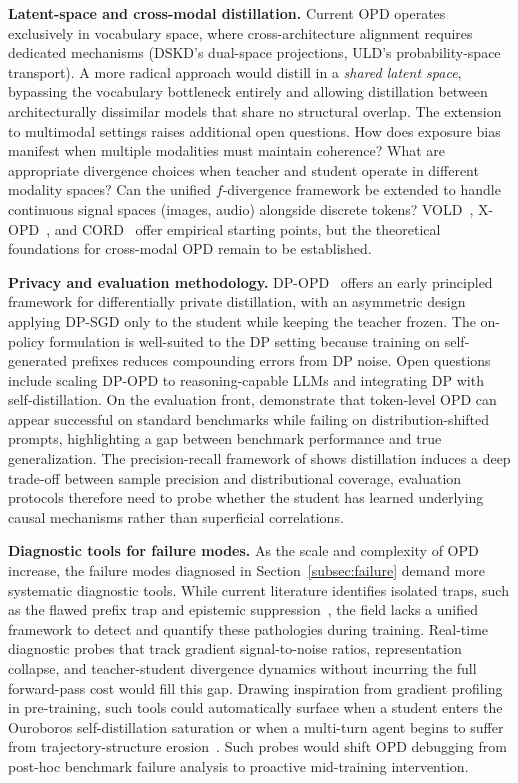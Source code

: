 \documentclass{article} %
\begin{document}
\textbf{Latent-space and cross-modal distillation.} Current OPD operates exclusively in vocabulary space, where cross-architecture alignment requires dedicated mechanisms (DSKD's dual-space projections, ULD's probability-space transport). A more radical approach would distill in a \emph{shared latent space}, bypassing the vocabulary bottleneck entirely and allowing distillation between architecturally dissimilar models that share no structural overlap. The extension to multimodal settings raises additional open questions. How does exposure bias manifest when multiple modalities must maintain coherence? What are appropriate divergence choices when teacher and student operate in different modality spaces? Can the unified $f$-divergence framework be extended to handle continuous signal spaces (images, audio) alongside discrete tokens? VOLD~\citep{2510.23497}, X-OPD~\citep{2603.24596}, and CORD~\citep{2601.16547} offer empirical starting points, but the theoretical foundations for cross-modal OPD remain to be established.

\textbf{Privacy and evaluation methodology.} DP-OPD~\citep{2604.04461} offers an early principled framework for differentially private distillation, with an asymmetric design applying DP-SGD only to the student while keeping the teacher frozen. The on-policy formulation is well-suited to the DP setting because training on self-generated prefixes reduces compounding errors from DP noise. Open questions include scaling DP-OPD to reasoning-capable LLMs and integrating DP with self-distillation. On the evaluation front, \citet{2603.25562} demonstrate that token-level OPD can appear successful on standard benchmarks while failing on distribution-shifted prompts, highlighting a gap between benchmark performance and true generalization. The precision-recall framework of \citet{2505.13111} shows distillation induces a deep trade-off between sample precision and distributional coverage, evaluation protocols therefore need to probe whether the student has learned underlying causal mechanisms rather than superficial correlations.

\textbf{Diagnostic tools for failure modes.} As the scale and complexity of OPD increase, the failure modes diagnosed in Section~\ref{subsec:failure} demand more systematic diagnostic tools. While current literature identifies isolated traps, such as the flawed prefix trap and epistemic suppression~\citep{2603.24472}, the field lacks a unified framework to detect and quantify these pathologies during training. Real-time diagnostic probes that track gradient signal-to-noise ratios, representation collapse, and teacher-student divergence dynamics without incurring the full forward-pass cost would fill this gap. Drawing inspiration from gradient profiling in pre-training, such tools could automatically surface when a student enters the Ouroboros self-distillation saturation or when a multi-turn agent begins to suffer from trajectory-structure erosion~\citep{2605.02943}. Such probes would shift OPD debugging from post-hoc benchmark failure analysis to proactive mid-training intervention.
\end{document}
